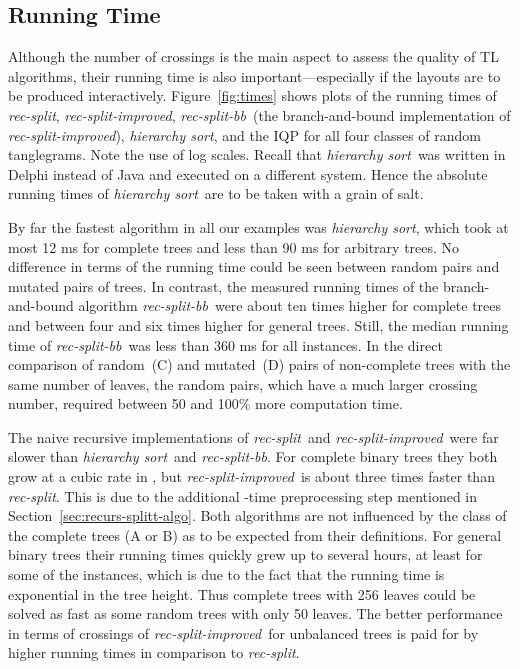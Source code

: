 \documentclass[runningheads,a4paper]{llncs}
\newcommand{\recsplit}{\emph{rec-split}}
\newcommand{\recimproved}{\emph{rec-split-improved}}
\newcommand{\recbb}{\emph{rec-split-bb}}
\newcommand{\hiersort}{\emph{hierarchy sort}}
\begin{document}
\subsection{Running Time}\label{sec:runn-time-perf}

Although the number of crossings is the main aspect to assess the
quality of TL algorithms, their running time is also
important---especially if the layouts are to be produced
interactively. Figure~\ref{fig:times} shows plots of the running times
of \recsplit, \recimproved, \recbb\ (the branch-and-bound
implementation of \recimproved), \hiersort, and the IQP for all four
classes of random tanglegrams.  Note the use of log scales.  
Recall that \hiersort\ was written in
Delphi instead of Java and executed on a different system. Hence the
absolute running times of \hiersort\ are to be taken with a grain of
salt. 

By far the fastest algorithm in all our examples was \hiersort,
which took at most 12 ms for complete trees and less than 90 ms for
arbitrary trees. No difference in terms of the running time could be
seen between random pairs and mutated pairs of trees. In contrast,
the measured running times of the branch-and-bound algorithm \recbb\
were about ten times higher for complete trees and between four and
six times higher for general trees. Still, the median running time
of \recbb\ was less than 360 ms for all instances. In the direct
comparison of random~(C) and mutated~(D) pairs of non-complete trees
with the same number of leaves, the random pairs, which have a much
larger crossing number, required between 50 and 100\% more computation
time.

The naive recursive implementations of \recsplit\ and \recimproved\
were far slower than \hiersort\ and \recbb. For complete binary
trees they both grow at a cubic rate in , but \recimproved\ is
about three times faster than \recsplit. This is due to the additional
-time 
preprocessing step mentioned in Section~\ref{sec:recurs-splitt-algo}.
Both algorithms
are not influenced by the class of the complete trees (A or B) as to
be expected from their definitions. For general binary trees their
running times quickly grew up to several hours, at least for some of
the instances, which is due to the fact that the
running time is exponential in the tree height. Thus
complete trees with 256 leaves could be solved as fast as
some random trees with only 50 leaves. The better performance in
terms of crossings of \recimproved\ for unbalanced trees is paid for
by higher running times in comparison to \recsplit.
\end{document}
